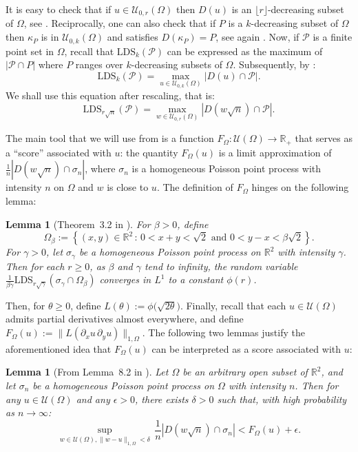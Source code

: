 \documentclass{article}
\newtheorem{lem}[theorem]{Lemma}
\theoremstyle{remark}
\def\R{\mathbb{R}}
\newcommand{\card}[1]{\left|#1\right|}
\def\LDS{\mathrm{LDS}}
\def\pts{\mathcal{P}}
\def\Usjo{\mathcal{U}}
\begin{document}
It is easy to check that if $u\in\Usjo_{0,r}(\Omega)$ then $D(u)$ is an $\lfloor r\rfloor$-decreasing subset of $\Omega$, see \cite[Lemma~6.2]{S23}.
Reciprocally, one can also check that if $P$ is a $k$-decreasing subset of $\Omega$ then $\kappa_P$ is in $\Usjo_{0,k}(\Omega)$ and satisfies $D(\kappa_P)=P$, see again \cite[Lemma~6.2]{S23}.
Now, if $\pts$ is a finite point set in $\Omega$, recall that $\LDS_k(\pts)$ can be expressed as the maximum of $\card{\pts \cap P}$ where $P$ ranges over $k$-decreasing subsets of $\Omega$.
Subsequently, by \cite[Lemma~6.2]{S23}:
\[
    \LDS_k(\pts) = \max_{u\in\Usjo_{0,k}(\Omega)} \card{D(u)\cap\pts} .
\]
We shall use this equation after rescaling, that is:
\begin{equation}\label{eq: link LDS Sjo D}
    \LDS_{r\sqrt n}(\pts) = \max_{w\in\Usjo_{0,r}(\Omega)} \card{D(w\sqrt n)\cap\pts} .
\end{equation}

The main tool that we will use from \cite{S23} is a function $F_\Omega : \Usjo(\Omega) \to \R_+$ that serves as a ``score'' associated with $u$: 
the quantity $F_\Omega(u)$ is a limit approximation of $\frac1n \card{D(w\sqrt n)\cap \sigma_n}$, where $\sigma_n$ is a homogeneous Poisson point process with intensity $n$ on $\Omega$ and $w$ is close to $u$.
The definition of $F_\Omega$ hinges on the following lemma:

\begin{lem}[Theorem~3.2 in \cite{S23}]
    For $\beta>0$, define
    \[
        \Omega_\beta := \left\{ (x,y)\in\R^2 \,:\, 0<x+y<\sqrt2 \text{ and } 0<y-x<\beta\sqrt2 \right\} .
    \]
    For $\gamma>0$, let $\sigma_\gamma$ be a homogeneous Poisson point process on $\R^2$ with intensity $\gamma$.
    Then for each $r\ge0$, as $\beta$ and $\gamma$ tend to infinity, the random variable $\frac{1}{\beta\gamma}\LDS_{r\sqrt\gamma}\left( \sigma_\gamma \cap \Omega_\beta \right)$ converges in $L^1$ to a constant $\phi(r)$.
\end{lem}

Then, for $\theta\ge0$, define $L(\theta) := \phi\big( \sqrt{2\theta} \big)$.
Finally, recall that each $u\in\Usjo(\Omega)$ admits partial derivatives almost everywhere, and define $F_\Omega(u) := \lVert L(\partial_x u \, \partial_y u) \rVert_{1,\Omega}$.
The following two lemmas justify the aforementioned idea that $F_\Omega(u)$ can be interpreted as a score associated with $u$:

\begin{lem}[From Lemma~8.2 in \cite{S23}]\label{lem: F serves as a global upper bound}
    Let $\Omega$ be an arbitrary open subset of $\R^2$, and let $\sigma_n$ be a homogeneous Poisson point process on $\Omega$ with intensity $n$.
    Then for any $u\in\Usjo(\Omega)$ and any $\epsilon>0$, there exists $\delta>0$ such that, with high probability as $n\to\infty$:
    \[
        \sup_{w\in\Usjo(\Omega) , \lVert w-u \rVert_{1,\Omega} < \delta} \,
        \frac1n \card{ D(w\sqrt n) \cap \sigma_n } < F_\Omega(u) + \epsilon .
    \]
\end{lem}
\end{document}
